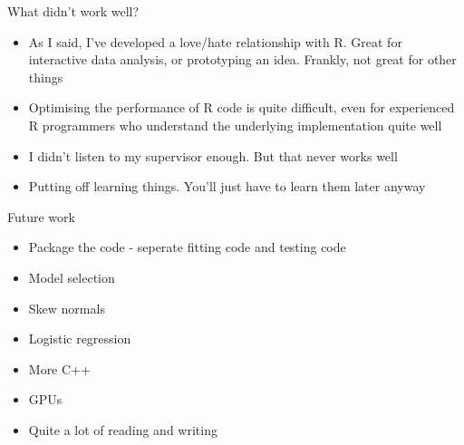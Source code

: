 \documentclass{beamer}
\begin{document}
\begin{frame}{What didn't work well?}
	\begin{itemize}
		\item As I said, I've developed a love/hate relationship with R. Great for interactive data analysis, or
					prototyping an idea. Frankly, not great for other things
		\item Optimising the performance of R code is quite difficult, even for experienced R 
					programmers who understand the underlying implementation quite well
		\item I didn't listen to my supervisor enough. But that never works well
		\item Putting off learning things. You'll just have to learn them later anyway
	\end{itemize}
\end{frame}

\begin{frame}{Future work}
	\begin{itemize}
		\item Package the code - seperate fitting code and testing code
		\item Model selection
		\item Skew normals
		\item Logistic regression
		\item More C++
		\item GPUs
		\item Quite a lot of reading and writing
	\end{itemize}
\end{frame}
\end{document}
